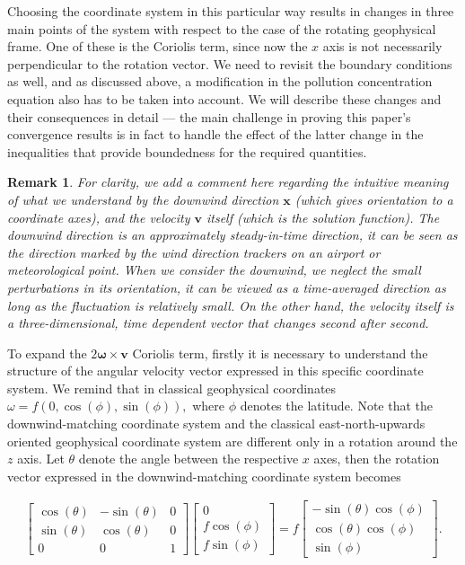 \documentclass[11pt, a4paper]{article}
\newtheorem{remark}{Remark}
\begin{document}
Choosing the coordinate system in this particular way results in changes in three main points of the system with respect to the case of the rotating geophysical frame. One of these is the Coriolis term, since now the $x$ axis is not necessarily perpendicular to the rotation vector. We need to revisit the boundary conditions as well, and as discussed above, a modification in the pollution concentration equation also has to be taken into account. We will describe these changes and their consequences in detail --- the main challenge in proving this paper's convergence results is in fact to handle the effect of the latter change in the inequalities that provide boundedness for the required quantities.

\begin{remark} \normalfont
For clarity, we add a comment here regarding the intuitive meaning of what we understand by the downwind direction $\mathbf{x}$ (which gives orientation to a coordinate axes), and the velocity $\mathbf{v}$ itself (which is the solution function). The downwind direction is an approximately steady-in-time direction, it can be seen as the direction marked by the wind direction trackers on an airport or meteorological point. When we consider the downwind, we neglect the small perturbations in its orientation, it can be viewed as a time-averaged direction as long as the fluctuation is relatively small. On the other hand, the velocity itself is a three-dimensional, time dependent vector that changes second after second.
\end{remark}

To expand the $2 \mathbf{\omega} \times \mathbf{v}$ Coriolis term, firstly it is necessary to understand the structure of the angular velocity vector expressed in this specific coordinate system. We remind that in classical geophysical coordinates $\omega = f (0, \cos(\phi), \sin(\phi)),$ where $\phi$ denotes the latitude. Note that the downwind-matching coordinate system and the classical east-north-upwards oriented geophysical coordinate system are different only in a rotation around the $z$ axis. Let $\theta$ denote the angle between the respective $x$ axes, then the rotation vector expressed in the downwind-matching coordinate system becomes

\begin{gather}
\begin{bmatrix} \cos(\theta) & -\sin(\theta) & 0 \\ \sin(\theta) & \cos(\theta) & 0 \\ 0 & 0 & 1 \end{bmatrix} \begin{bmatrix} 0 \\ f \cos(\phi) \\ f \sin(\phi) \end{bmatrix}
=
f \begin{bmatrix} -\sin(\theta)\cos(\phi) \\ \cos(\theta) \cos(\phi) \\ \sin(\phi) \end{bmatrix}.
\end{gather}
\end{document}
